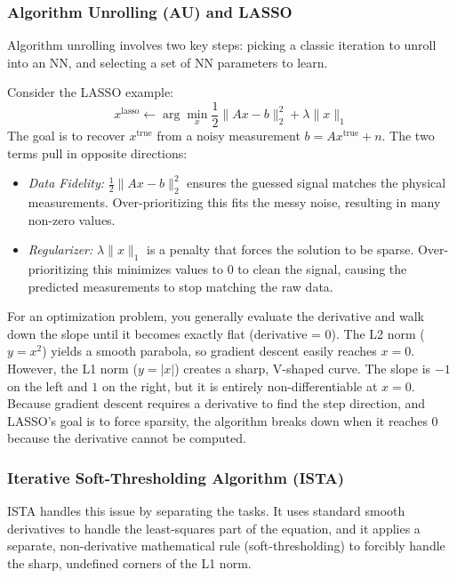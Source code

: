\documentclass[conference]{IEEEtran}
\begin{document}
\subsubsection{Algorithm Unrolling (AU) and LASSO \texorpdfstring{\cite{monga2021algorithm}}{}}

Algorithm unrolling involves two key steps: picking a classic iteration to unroll into an NN, and selecting a set of NN parameters to learn.

Consider the LASSO example:
\begin{equation}
x^{\text{lasso}} \leftarrow \arg\min_x \frac{1}{2}\|Ax-b\|_2^2 + \lambda\|x\|_1
\end{equation}
The goal is to recover $x^{\text{true}}$ from a noisy measurement $b = Ax^{\text{true}} + n$. The two terms pull in opposite directions:
\begin{itemize}
    \item \textit{Data Fidelity:} $\frac{1}{2}\|Ax-b\|_2^2$ ensures the guessed signal matches the physical measurements. Over-prioritizing this fits the messy noise, resulting in many non-zero values.
    \item \textit{Regularizer:} $\lambda\|x\|_1$ is a penalty that forces the solution to be sparse. Over-prioritizing this minimizes values to 0 to clean the signal, causing the predicted measurements to stop matching the raw data.
\end{itemize}

For an optimization problem, you generally evaluate the derivative and walk down the slope until it becomes exactly flat (derivative = $0$). The L2 norm ($y = x^2$) yields a smooth parabola, so gradient descent easily reaches $x=0$. However, the L1 norm ($y = |x|$) creates a sharp, V-shaped curve. The slope is $-1$ on the left and $1$ on the right, but it is entirely non-differentiable at $x=0$. Because gradient descent requires a derivative to find the step direction, and LASSO's goal is to force sparsity, the algorithm breaks down when it reaches $0$ because the derivative cannot be computed.

\subsubsection{Iterative Soft-Thresholding Algorithm (ISTA)}
ISTA handles this issue by separating the tasks. It uses standard smooth derivatives to handle the least-squares part of the equation, and it applies a separate, non-derivative mathematical rule (soft-thresholding) to forcibly handle the sharp, undefined corners of the L1 norm.
\end{document}
